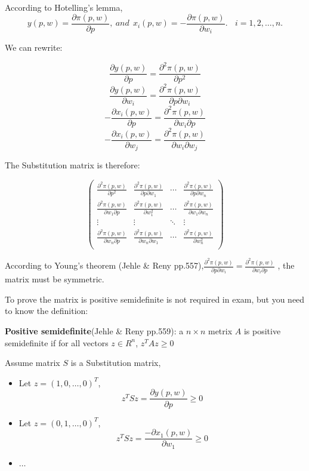\documentclass{article}
\begin{document}
\begin{mdframed}[backgroundcolor=blue!20,linecolor=white]

According to Hotelling's lemma,
$$y(p,w) = \frac{\partial \pi(p,w)}{\partial p},\ and \ \ x_i(p,w) = - \frac{\partial \pi(p,w)}{\partial w_i}. \ \ \ \ i = 1,2, \dots , n.$$

We can rewrite:

$$\frac{\partial y(p,w)}{\partial p} = \frac{\partial^2 \pi(p,w)}{\partial p^2}$$
$$\frac{\partial y(p,w)}{\partial w_i} = \frac{\partial^2 \pi(p,w)}{\partial p \partial w_i}$$
$$-\frac{\partial x_i(p,w)}{\partial p} = \frac{\partial^2 \pi(p,w)}{\partial w_i \partial p }$$
$$-\frac{\partial x_i(p,w)}{\partial w_j} = \frac{\partial^2 \pi(p,w)}{\partial w_i \partial w_j}$$

The Substitution matrix is therefore:

\begin{equation}
\left(
    \begin{array}{cccc}
    \frac{\partial^2 \pi(p,w)}{\partial p^2} & \frac{\partial^2 \pi(p,w)}{\partial p \partial w_1} & \cdots & \frac{\partial^2 \pi(p,w)}{\partial p \partial w_n} \\
    \frac{\partial^2 \pi(p,w)}{\partial w_1 \partial p } & \frac{\partial^2 \pi(p,w)}{\partial w_1^2} & \cdots & \frac{\partial^2 \pi(p,w)}{\partial w_1 \partial w_n} \\
    \vdots    &    \vdots & \ddots &   \vdots \\
    \frac{\partial^2 \pi(p,w)}{\partial w_n \partial p } &  \frac{\partial^2 \pi(p,w)}{\partial w_n \partial w_1} & \cdots &  \frac{\partial^2 \pi(p,w)}{\partial w_n^2} \\
    \end{array}
    \right)
\label{eq:subst_s}   
\end{equation}


According to Young's theorem (Jehle \& Reny pp.557),$\frac{\partial^2 \pi(p,w)}{\partial p \partial w_i} = \frac{\partial^2 \pi(p,w)}{\partial w_i \partial p }$ , the matrix must be symmetric.

To prove the matrix is positive semideﬁnite is not required in exam, but you need to know the definition:

\textbf{Positive semidefinite}(Jehle \& Reny pp.559): a $n \times n$ metrix $A$ is positive semidefinite if for
all vectors $z \in R^n$, $z^TAz \ge 0$

Assume matrix $S$ is a Substitution matrix,
\begin{itemize}
\item Let $z = (1,0 , \dots, 0)^T$, $$z^T S z = \frac{\partial y(p,w)}{\partial p} \ge 0$$
\item Let $z = (0,1 , \dots, 0)^T$, $$z^T S z = \frac{-\partial x_1(p,w)}{\partial w_1}  \ge 0$$
\item $\dots$
\end{itemize}

\end{mdframed}
\end{document}
